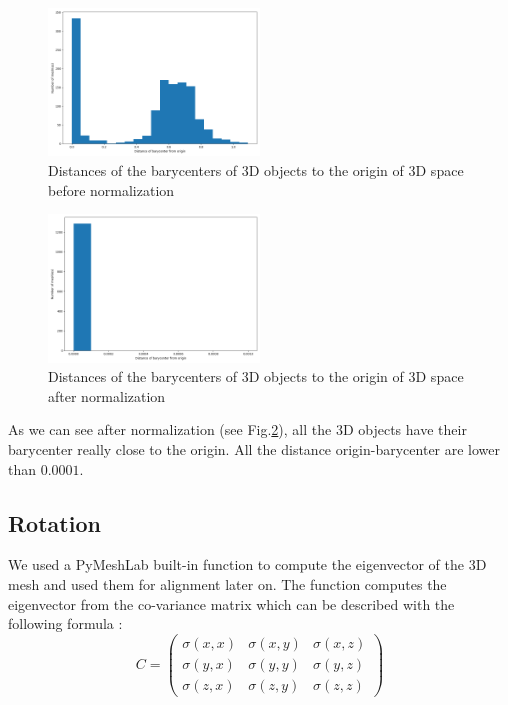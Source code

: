 \documentclass[10pt,twocolumn,letterpaper]{article}
\begin{document}
\begin{figure}[h!]
\begin{center}
  \includegraphics[width=0.5\textwidth]{picture/Initial barycenter}
  \caption{Distances of the barycenters of 3D objects to the origin of 3D space before normalization}
  \label{fig:barycenter-before}
  \end{center}
\end{figure}

\begin{figure}[h!]
\begin{center}
  \includegraphics[width=0.5\textwidth]{picture/Normalised barycenter}
  \caption{Distances of the barycenters of 3D objects to the origin of 3D space after normalization}
  \label{fig:barycenter-after}
  \end{center}
\end{figure}

As we can see after normalization (see Fig.\ref{fig:barycenter-after}),  all the 3D objects have their barycenter really close to the origin. All the distance origin-barycenter are lower than $0.0001$.

\subsection{Rotation}

	We used a PyMeshLab built-in function to compute the eigenvector of the 3D mesh and used them for alignment later on. The function computes the eigenvector from the co-variance matrix which can be described  with the following formula :
	$$ C = \begin{pmatrix}
   \sigma(x,x) & \sigma(x,y) & \sigma(x,z) \\
   \sigma(y,x) & \sigma(y,y) & \sigma(y,z) \\
   \sigma(z,x) & \sigma(z,y) & \sigma(z,z)
\end{pmatrix} $$
\end{document}
